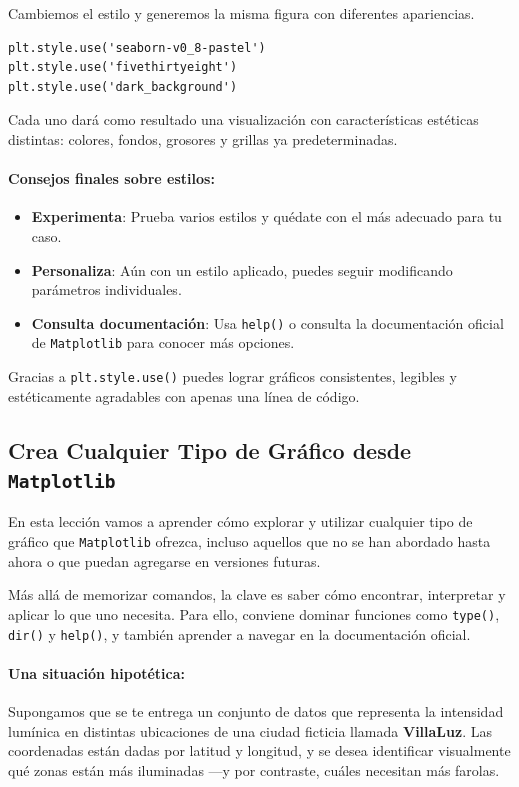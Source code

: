 \documentclass{article}
\theoremstyle{nonumberplain}
\begin{document}
Cambiemos el estilo y generemos la misma figura con diferentes apariencias.

\begin{verbatim}
plt.style.use('seaborn-v0_8-pastel')
plt.style.use('fivethirtyeight')
plt.style.use('dark_background')
\end{verbatim}

Cada uno dará como resultado una visualización con características estéticas distintas: colores, fondos, grosores y grillas ya predeterminadas.

\paragraph{Consejos finales sobre estilos:}
\begin{itemize}
    \item \textbf{Experimenta}: Prueba varios estilos y quédate con el más adecuado para tu caso.
    \item \textbf{Personaliza}: Aún con un estilo aplicado, puedes seguir modificando parámetros individuales.
    \item \textbf{Consulta documentación}: Usa \texttt{help()} o consulta la documentación oficial de \texttt{Matplotlib} para conocer más opciones.
\end{itemize}

Gracias a \texttt{plt.style.use()} puedes lograr gráficos consistentes, legibles y estéticamente agradables con apenas una línea de código.

\subsection*{Crea Cualquier Tipo de Gráfico desde \texttt{Matplotlib}}

En esta lección vamos a aprender cómo explorar y utilizar cualquier tipo de gráfico que \texttt{Matplotlib} ofrezca, incluso aquellos que no se han abordado hasta ahora o que puedan agregarse en versiones futuras.

Más allá de memorizar comandos, la clave es saber cómo encontrar, interpretar y aplicar lo que uno necesita. Para ello, conviene dominar funciones como \texttt{type()}, \texttt{dir()} y \texttt{help()}, y también aprender a navegar en la documentación oficial.

\paragraph{Una situación hipotética:} Supongamos que se te entrega un conjunto de datos que representa la intensidad lumínica en distintas ubicaciones de una ciudad ficticia llamada \textbf{VillaLuz}. Las coordenadas están dadas por latitud y longitud, y se desea identificar visualmente qué zonas están más iluminadas —y por contraste, cuáles necesitan más farolas.
\end{document}

